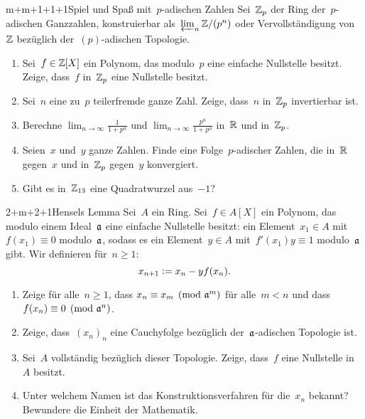 \documentclass[entwurf]{uebblatt}
\begin{document}

\begin{aufgabe}{m+m+1+1+1}{Spiel und Spaß mit~$p$-adischen Zahlen}
Sei~$\mathbb{Z}_p$ der Ring der~$p$-adischen Ganzzahlen, konstruierbar
als~$\varprojlim_n \mathbb{Z}/(p^n)$ oder Vervollständigung von~$\mathbb{Z}$ bezüglich
der~$(p)$-adischen Topologie.
\begin{enumerate}
\item Sei~$f \in \mathbb{Z}[X]$ ein Polynom, das modulo~$p$ eine einfache Nullstelle
besitzt. Zeige, dass~$f$ in~$\mathbb{Z}_p$ eine Nullstelle besitzt.
\item Sei~$n$ eine zu~$p$ teilerfremde ganze Zahl. Zeige, dass~$n$ in~$\mathbb{Z}_p$
invertierbar ist.
\item Berechne $\lim_{n \to \infty} \frac{1}{1 + p^n}$ und $\lim_{n \to \infty}
\frac{p^n}{1 + p^n}$ in~$\mathbb{R}$ und in~$\mathbb{Z}_p$.
\item Seien~$x$ und~$y$ ganze Zahlen. Finde eine Folge~$p$-adischer Zahlen, die
in~$\mathbb{R}$ gegen~$x$ und in~$\mathbb{Z}_p$ gegen~$y$ konvergiert.
\item Gibt es in~$\mathbb{Z}_{13}$ eine Quadratwurzel aus~$-1$?
\end{enumerate}
\end{aufgabe}

\begin{aufgabe}{2+m+2+1}{Hensels Lemma}
Sei~$A$ ein Ring. Sei~$f \in A[X]$ ein
Polynom, das modulo einem Ideal~$\mathfrak{a}$ eine einfache Nullstelle besitzt: ein Element~$x_1
\in A$ mit~$f(x_1) \equiv 0$ modulo~$\mathfrak{a}$, sodass es ein Element~$y \in A$
mit~$f'(x_1) y \equiv 1$ modulo~$\mathfrak{a}$ gibt.
Wir definieren für~$n \geq 1$: \[ x_{n+1} \vcentcolon= x_n - y f(x_n). \]
\begin{enumerate}
\item Zeige für alle~$n \geq 1$, dass $x_n \equiv x_m \pmod{\mathfrak{a}^m}$ für
alle~$m < n$ und dass~$f(x_n) \equiv 0 \pmod{\mathfrak{a}^n}$.
\item Zeige, dass~$(x_n)_n$ eine Cauchyfolge bezüglich der~$\mathfrak{a}$-adischen
Topologie ist.
\item Sei~$A$ vollständig bezüglich dieser Topologie. Zeige,
dass~$f$ eine Nullstelle in~$A$ besitzt.
\item Unter welchem Namen ist das Konstruktionsverfahren für die~$x_n$ bekannt?
Bewundere die Einheit der Mathematik.
\end{enumerate}
\end{aufgabe}
\end{document}
